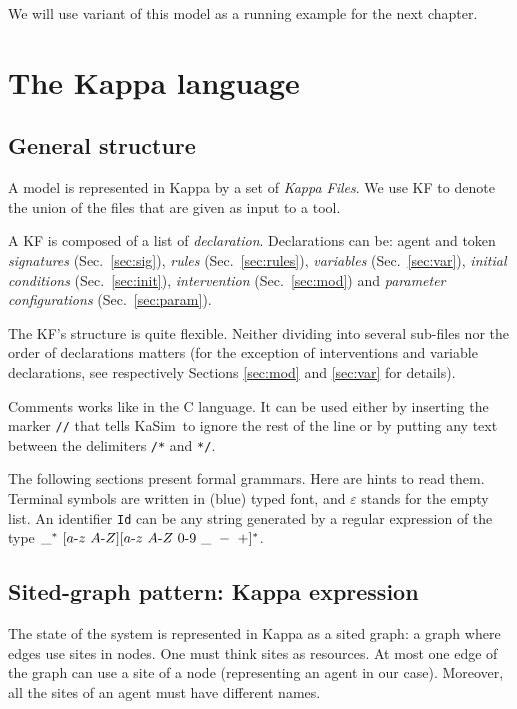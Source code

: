 \documentclass[11pt]{book}
\def\KaSim{\textsf{KaSim}}
\def\sep{\hbox{-}}
\def\ttt#1{\texttt{#1}}
\begin{document}
We will use variant of this model as a running example for the next chapter.

\chapter{The Kappa language}\label{chap:kappa}

\section{General structure}
A model is represented in Kappa by a set of \emph{Kappa Files}. We use
KF to denote the union of the files that are given
as input to a tool.

A KF is composed of a list of
\emph{declaration}.
Declarations can be: agent and token \emph{signatures}
(Sec.~\ref{sec:sig}), \emph{rules} (Sec.~\ref{sec:rules}),
\emph{variables} (Sec.~\ref{sec:var}), \emph{initial
  conditions} (Sec.~\ref{sec:init}),
\emph{intervention} (Sec.~\ref{sec:mod}) and
\emph{parameter configurations} (Sec.~\ref{sec:param}).

The KF's structure is quite flexible. Neither
dividing into several sub-files nor the order of
declarations matters (for the exception of
interventions and variable declarations, see
respectively Sections \ref{sec:mod} and \ref{sec:var} for details).

Comments works like in the C language. It can be used
either by inserting the marker \ttt{//} that tells \KaSim~to ignore
the rest of the line or by putting any text between the delimiters
\ttt{/*} and \ttt{*/}.

The following sections present formal grammars. Here are hints to read
them.  Terminal symbols are written in (blue) typed font, and
$\varepsilon$ stands for the empty list. An identifier \ttt{Id} can be
any string generated by a regular expression of the type $\_^*\ [
  a\sep z\ A\sep Z][a\sep z\ A \sep Z\ 0\sep 9\ \_ \ -\ +]^*$.

\section{Sited-graph pattern: Kappa expression}

The state of the system is represented in Kappa as a sited graph: a
graph where edges use sites in nodes. One must think sites as
resources. At most one edge of the graph can use a site of a node
(representing an agent in our case). Moreover, all the sites of an
agent must have different names.
\end{document}
